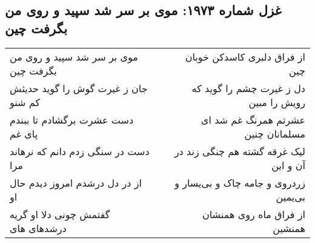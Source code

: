 \begin{center}
\section*{غزل شماره ۱۹۷۳: موی بر سر شد سپید و روی من بگرفت چین}
\label{sec:1973}
\begin{longtable}{l p{0.5cm} r}
موی بر سر شد سپید و روی من بگرفت چین
&&
از فراق دلبری کاسدکن خوبان چین
\\
جان ز غیرت گوش را گوید حدیثش کم شنو
&&
دل ز غیرت چشم را گوید که رویش را مبین
\\
دست عشرت برگشادم تا ببندم پای غم
&&
عشرتم همرنگ غم شد ای مسلمانان چنین
\\
دست در سنگی زدم دانم که نرهاند مرا
&&
لیک غرقه گشته هم چنگی زند در آن و این
\\
از در دل درشدم امروز دیدم حال او
&&
زردروی و جامه چاک و بی‌یسار و بی‌یمین
\\
گفتمش چونی دلا او گریه درشدهای های
&&
از فراق ماه روی همنشان همنشین
\\
\end{longtable}
\end{center}
